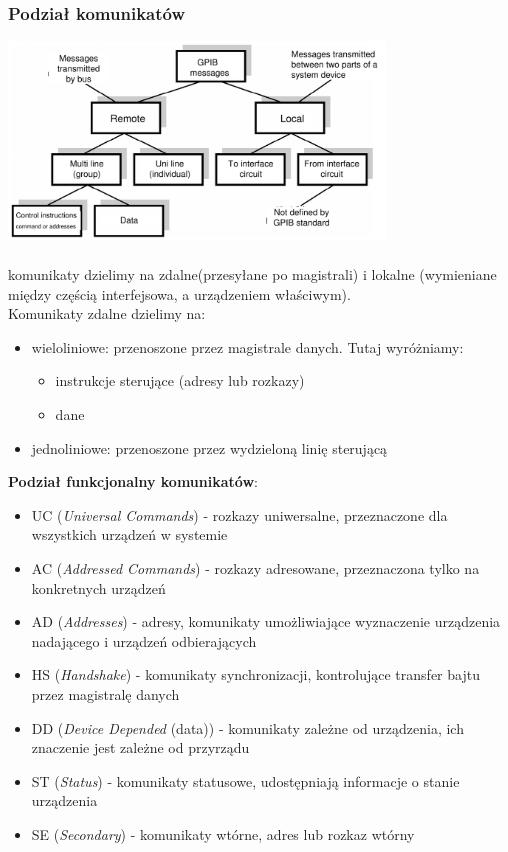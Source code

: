 \subsubsection{Podział komunikatów}
\includegraphics[width=10cm]{./wyklady/IEEE488_SCPI_8_1.pdf}\\\\
komunikaty dzielimy na zdalne(przesyłane po magistrali)  i lokalne (wymieniane między częścią interfejsowa, a urządzeniem właściwym).\\
Komunikaty zdalne dzielimy na:
\begin{itemize}
	\item wieloliniowe: przenoszone przez magistrale danych. Tutaj wyróżniamy:
	\begin{itemize}
		\item instrukcje sterujące (adresy lub rozkazy)
		\item dane
	\end{itemize}
	\item jednoliniowe: przenoszone przez wydzieloną linię sterującą
\end{itemize}
\newpage
\textbf{Podział funkcjonalny komunikatów}:
\begin{itemize}
	\item UC (\emph{Universal Commands}) - rozkazy uniwersalne, przeznaczone dla wszystkich urządzeń w systemie
	\item AC (\emph{Addressed Commands}) - rozkazy adresowane, przeznaczona tylko na konkretnych urządzeń
	\item AD (\emph{Addresses}) - adresy, komunikaty umożliwiające wyznaczenie urządzenia nadającego i urządzeń odbierających
	\item HS (\emph{Handshake}) - komunikaty synchronizacji, kontrolujące transfer bajtu przez magistralę danych
	\item DD (\emph{Device Depended} (data)) - komunikaty zależne od urządzenia, ich znaczenie jest zależne od przyrządu
	\item ST (\emph{Status}) - komunikaty statusowe, udostępniają informacje o stanie urządzenia
	\item SE (\emph{Secondary}) - komunikaty wtórne, adres lub rozkaz wtórny
\end{itemize}

